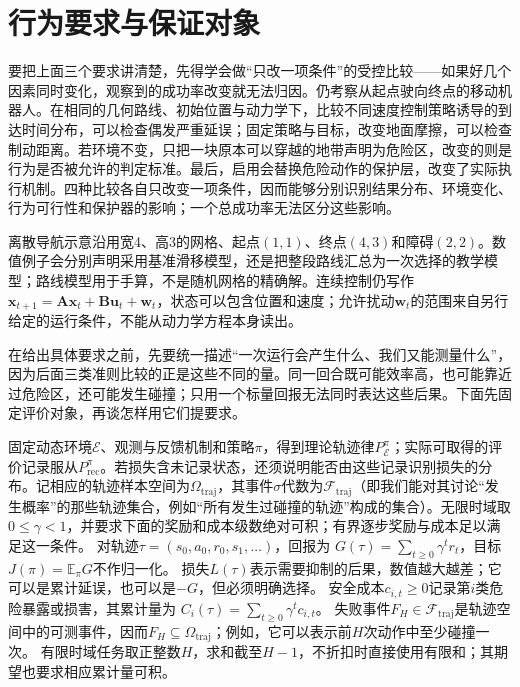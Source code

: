 \section{行为要求与保证对象}
\label{sec:rl-trustworthy-requirements}

要把上面三个要求讲清楚，先得学会做“只改一项条件”的受控比较——如果好几个因素同时变化，观察到的成功率改变就无法归因。仍考察从起点驶向终点的移动机器人。在相同的几何路线、初始位置与动力学下，比较不同速度控制策略诱导的到达时间分布，可以检查偶发严重延误；固定策略与目标，改变地面摩擦，可以检查制动距离。若环境不变，只把一块原本可以穿越的地带声明为危险区，改变的则是行为是否被允许的判定标准。最后，启用会替换危险动作的保护层，改变了实际执行机制。四种比较各自只改变一项条件，因而能够分别识别结果分布、环境变化、行为可行性和保护器的影响；一个总成功率无法区分这些影响。

离散导航示意沿用宽4、高3的网格、起点$(1,1)$、终点$(4,3)$和障碍$(2,2)$。数值例子会分别声明采用基准滑移模型，还是把整段路线汇总为一次选择的教学模型；路线模型用于手算，不是随机网格的精确解。连续控制仍写作$\bm{x}_{t+1}=\bm{A}\bm{x}_t+\bm{B}\bm{u}_t+\bm{w}_t$，状态可以包含位置和速度；允许扰动$\bm{w}_t$的范围来自另行给定的运行条件，不能从动力学方程本身读出。

在给出具体要求之前，先要统一描述“一次运行会产生什么、我们又能测量什么”，因为后面三类准则比较的正是这些不同的量。同一回合既可能效率高，也可能靠近过危险区，还可能发生碰撞；只用一个标量回报无法同时表达这些后果。下面先固定评价对象，再谈怎样用它们提要求。

\begin{definition}[回报、损失、成本与失败事件]
  \label{def:rl-trustworthy-objects}
  固定动态环境$\mathcal E$、观测与反馈机制和策略$\pi$，得到理论轨迹律$P_{\mathcal E}^\pi$；实际可取得的评价记录服从$P_{\mathrm{rec}}^\pi$。若损失含未记录状态，还须说明能否由这些记录识别损失的分布。记相应的轨迹样本空间为$\Omega_{\mathrm{traj}}$，其事件$\sigma$代数为$\mathcal F_{\mathrm{traj}}$（即我们能对其讨论“发生概率”的那些轨迹集合，例如“所有发生过碰撞的轨迹”构成的集合）。无限时域取$0\leq\gamma<1$，并要求下面的奖励和成本级数绝对可积；有界逐步奖励与成本足以满足这一条件。
  对轨迹$\tau=(s_0,a_0,r_0,s_1,\ldots)$，回报为
  $G(\tau)=\sum_{t\geq0}\gamma^t r_t$，目标$J(\pi)=\mathbb E_\pi G$不作归一化。
  损失$L(\tau)$表示需要抑制的后果，数值越大越差；它可以是累计延误，也可以是$-G$，但必须明确选择。
  安全成本$c_{i,t}\geq0$记录第$i$类危险暴露或损害，其累计量为
  $C_i(\tau)=\sum_{t\geq0}\gamma^t c_{i,t}$。
  失败事件$F_H\in\mathcal F_{\mathrm{traj}}$是轨迹空间中的可测事件，因而$F_H\subseteq\Omega_{\mathrm{traj}}$；例如，它可以表示前$H$次动作中至少碰撞一次。
  有限时域任务取正整数$H$，求和截至$H-1$，不折扣时直接使用有限和；其期望也要求相应累计量可积。
\end{definition}

